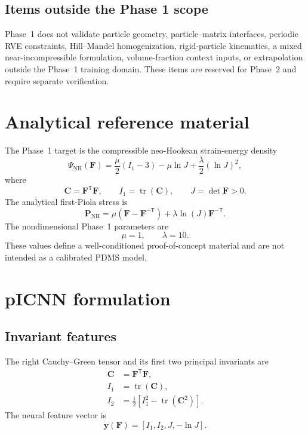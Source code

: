 \documentclass[11pt,a4paper]{article}
\newcommand{\F}{\mathbf{F}}
\newcommand{\C}{\mathbf{C}}
\newcommand{\Pstress}{\mathbf{P}}
\begin{document}
\subsection{Items outside the Phase 1 scope}

Phase~1 does not validate particle geometry, particle--matrix interfaces,
periodic RVE constraints, Hill--Mandel homogenization, rigid-particle
kinematics, a mixed near-incompressible formulation, volume-fraction context
inputs, or extrapolation outside the Phase~1 training domain. These items are
reserved for Phase~2 and require separate verification.

\section{Analytical reference material}

The Phase~1 target is the compressible neo-Hookean strain-energy density
\begin{equation}
  \Psi_{\mathrm{NH}}(\F)
  =
  \frac{\mu}{2}(I_1-3)
  -\mu\ln J
  +\frac{\lambda}{2}(\ln J)^2,
  \label{eq:nh-energy}
\end{equation}
where
\begin{equation}
  \C=\F^\mathsf{T}\F,\qquad
  I_1=\operatorname{tr}(\C),\qquad
  J=\det\F>0.
\end{equation}
The analytical first-Piola stress is
\begin{equation}
  \Pstress_{\mathrm{NH}}
  =
  \mu\left(\F-\F^{-\mathsf{T}}\right)
  +\lambda\ln(J)\F^{-\mathsf{T}}.
  \label{eq:nh-stress}
\end{equation}
The nondimensional Phase~1 parameters are
\begin{equation}
  \mu=1,\qquad \lambda=10.
\end{equation}
These values define a well-conditioned proof-of-concept material and are not
intended as a calibrated PDMS model.

\section{pICNN formulation}

\subsection{Invariant features}

The right Cauchy--Green tensor and its first two principal invariants are
\begin{align}
  \C &= \F^\mathsf{T}\F,\\
  I_1 &= \operatorname{tr}(\C),\\
  I_2 &=
  \frac{1}{2}\left[
    I_1^2-\operatorname{tr}(\C^2)
  \right].
\end{align}
The neural feature vector is
\begin{equation}
  \mathbf{y}(\F)
  =
  \left[I_1,I_2,J,-\ln J\right].
  \label{eq:features}
\end{equation}
\end{document}

